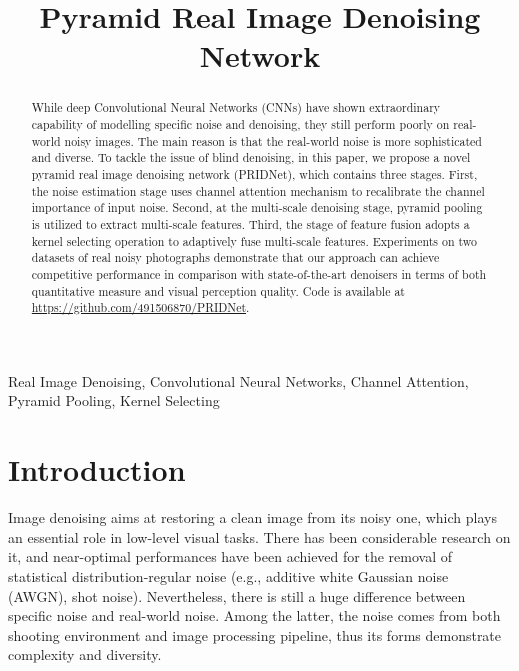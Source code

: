 \documentclass[conference]{IEEEtran}
\begin{document}
\title{Pyramid Real Image Denoising Network}





\author{
}


\maketitle


\begin{abstract}
While deep Convolutional Neural Networks (CNNs) have shown extraordinary capability of modelling specific noise and denoising, they still perform poorly on real-world noisy images. The main reason is that the real-world noise is more sophisticated and diverse. To tackle the issue of blind denoising, in this paper, we propose a novel pyramid real image denoising network (PRIDNet), which contains three stages. First, the noise estimation stage uses channel attention mechanism to recalibrate the channel importance of input noise. Second, at the multi-scale denoising stage, pyramid pooling is utilized to extract multi-scale features. Third, the stage of feature fusion adopts a kernel selecting operation to adaptively fuse multi-scale features. Experiments on two datasets of real noisy photographs demonstrate that our approach can achieve competitive performance in comparison with state-of-the-art denoisers in terms of both quantitative measure and visual perception quality. Code is available at \url{https://github.com/491506870/PRIDNet}.
\end{abstract}

\begin{IEEEkeywords}
Real Image Denoising, Convolutional Neural Networks, Channel Attention, Pyramid Pooling, Kernel Selecting
\end{IEEEkeywords}

\section{Introduction}
Image denoising aims at restoring a clean image from its noisy one, which plays an essential role in low-level visual tasks. There has been considerable research on it, and near-optimal performances have been achieved for the removal of statistical distribution-regular noise (e.g., additive white Gaussian noise (AWGN), shot noise). Nevertheless, there is still a huge difference between specific noise and real-world noise. Among the latter, the noise comes from both shooting environment and image processing pipeline, thus its forms demonstrate complexity and diversity.
\end{document}

